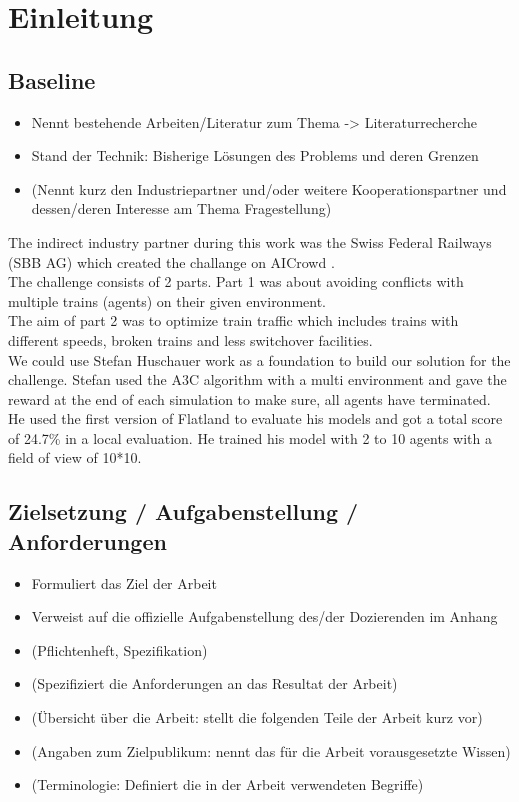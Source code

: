 \chapter{Einleitung}\label{chap.einleitung}


\section{Baseline}\label{baseline}

\begin{itemize}
\item Nennt bestehende Arbeiten/Literatur zum Thema -> Literaturrecherche
\item Stand der Technik: Bisherige Lösungen des Problems und deren Grenzen
\item (Nennt kurz den Industriepartner und/oder weitere Kooperationspartner und dessen/deren Interesse am Thema Fragestellung)
\end{itemize}
The indirect industry partner during this work was the Swiss Federal Railways (SBB AG) which created the challange on AICrowd \cite{aicrowd}.\\
The challenge consists of 2 parts. Part 1 was about avoiding conflicts with multiple trains (agents) on their given environment. \\
The aim of part 2 was to optimize train traffic which includes trains with different speeds, broken trains and less switchover facilities.\\
We could use Stefan Huschauer\cite{flatlandstephan} work as a foundation to build our solution for the challenge.
Stefan used the A3C algorithm with a multi environment and gave the reward at the end of  each simulation to make sure, all agents have terminated.\\
He used the first version of Flatland to evaluate his models and got a total score of 24.7\% in a local evaluation.%
He trained his model with 2 to 10 agents with a field of view of 10*10. %


\section{Zielsetzung / Aufgabenstellung / Anforderungen}\label{zielsetzung}

\begin{itemize}
\item Formuliert das Ziel der Arbeit
\item Verweist auf die offizielle Aufgabenstellung des/der Dozierenden im Anhang
\item (Pflichtenheft, Spezifikation)
\item (Spezifiziert die Anforderungen an das Resultat der Arbeit)
\item (Übersicht über die Arbeit: stellt die folgenden Teile der Arbeit kurz vor)
\item (Angaben zum Zielpublikum: nennt das für die Arbeit vorausgesetzte Wissen)
\item (Terminologie: Definiert die in der Arbeit verwendeten Begriffe)
\end{itemize}

